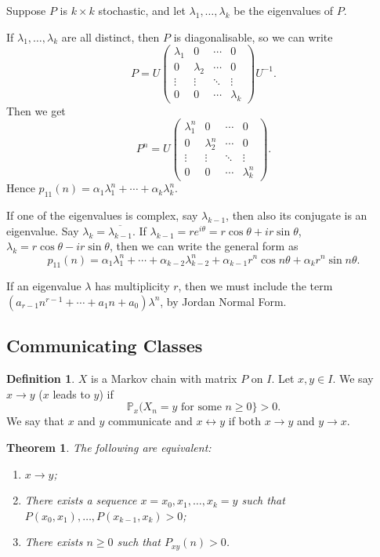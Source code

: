 \documentclass[12pt]{article}
\newtheorem{theorem}{Theorem}[section]
\theoremstyle{definition}
\newtheorem{definition}{Definition}[section]
\theoremstyle{remark}
\begin{document}
Suppose $P$ is $k \times k$ stochastic, and let $\lambda_1, \ldots, \lambda_k$ be the eigenvalues of $P$.

If $\lambda_1, \ldots, \lambda_k$ are all distinct, then $P$ is diagonalisable, so we can write
\[
P = U
\begin{pmatrix}
	\lambda_1 & 0 & \cdots & 0 \\
	0 & \lambda_2 & \cdots & 0 \\
	\vdots & \vdots & \ddots & \vdots \\
	0 & 0 & \cdots & \lambda_k
\end{pmatrix}
U^{-1}
.\]
Then we get
\[
P^{n} = U
\begin{pmatrix}
	\lambda_1^{n} & 0 & \cdots & 0 \\
	0 & \lambda_2^{n} & \cdots & 0 \\
	\vdots & \vdots & \ddots & \vdots \\
	0 & 0 & \cdots & \lambda_k^{n}
\end{pmatrix}
.\]
Hence $p_{11}(n) = \alpha_1 \lambda_1^{n} + \cdots + \alpha_k \lambda_k^{n}$.

If one of the eigenvalues is complex, say $\lambda_{k-1}$, then also its conjugate is an eigenvalue. Say $\lambda_{k} = \overline{\lambda_{k-1}}$. If $\lambda_{k-1} = r e^{i \theta} = r \cos \theta + i r \sin \theta$, $\lambda_k = r \cos \theta - i r \sin \theta$, then we can write the general form as
\[
	p_{11}(n) = \alpha_1 \lambda_1^{n} + \cdots + \alpha_{k-2} \lambda_{k-2}^{n} + \alpha_{k-1} r^{n} \cos n \theta + \alpha_{k} r^{n} \sin n \theta
.\]

If an eigenvalue $\lambda$ has multiplicity $r$, then we must include the term $(a_{r-1}n^{r-1} + \cdots + a_1 n + a_0) \lambda^{n}$, by Jordan Normal Form.

\subsection{Communicating Classes}%
\label{sub:communicating_classes}

\begin{definition}
	$X$ is a Markov chain with matrix $P$ on $I$. Let $x, y \in I$. We say $x \to y$ ($x$ leads to $y$) if
	\[
	\mathbb{P}_x(X_n = y \text{ for some } n \geq 0\} > 0
	.\]
	We say that $x$ and $y$ communicate and $x \leftrightarrow y$ if both $x \to y$ and $y \to x$.
\end{definition}

\begin{theorem}
	The following are equivalent:
	\begin{enumerate}[\normalfont(i)]
		\item $x \to y$;
		\item There exists a sequence $x = x_0, x_1, \ldots, x_k = y$ such that $P(x_0, x_1), \ldots, P(x_{k-1}, x_k) > 0$;
		\item There exists $n \geq 0$ such that $P_{xy}(n) > 0$.
	\end{enumerate}	
\end{theorem}
\end{document}
